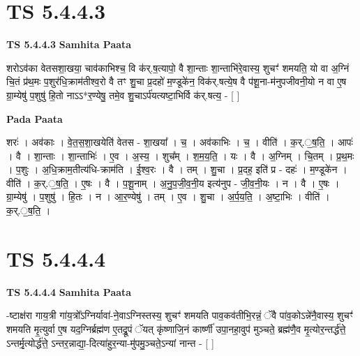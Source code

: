 \documentclass[17pt]{extarticle}
\begin{document}
\section*{ TS 5.4.4.3 }

\textbf{TS 5.4.4.3 } \newline
\textbf{Samhita Paata} \newline

शरोऽव॑का वेतसशा॒खया॒ चाव॑काभिश्च॒ वि क॑र्.ष॒त्यापो॒ वै शा॒न्ताः शा॒न्ताभि॑रे॒वास्य॒ शुचꣳ॑ शमयति॒ यो वा अ॒ग्निं चि॒तं प्र॑थ॒मः प॒शुर॑धि॒क्राम॑तीश्व॒रो वै तꣳ शु॒चा प्र॒दहो॑ म॒ण्डूके॑न॒ विक॑र्.षत्ये॒ष वै प॑शू॒ना-म॑नुपजीवनी॒यो न वा ए॒ष ग्रा॒म्येषु॑ प॒शुषु॑ हि॒तो नाऽऽ*र॒ण्येषु॒ तमे॒व शु॒चाऽर्प॑यत्यष्टा॒भिर्वि क॑र्.षत्य॒ - [  ] \newline

\textbf{Pada Paata} \newline

शरः॑ । अव॑काः । वे॒त॒स॒शा॒खयेति॑ वेतस - शा॒खया᳚ । च॒ । अव॑काभिः । च॒ । वीति॑ । क॒र्.॒ष॒ति॒ । आपः॑ । वै । शा॒न्ताः । शा॒न्ताभिः॑ । ए॒व । अ॒स्य॒ । शुच᳚म् । श॒म॒य॒ति॒ । यः । वै । अ॒ग्निम् । चि॒तम् । प्र॒थ॒मः । प॒शुः । अ॒धि॒क्राम॒तीत्य॑धि-क्राम॑ति । ई॒श्व॒रः । वै । तम् । शु॒चा । प्र॒दह॒ इति॑ प्र - दहः॑ । म॒ण्डूके॑न । वीति॑ । क॒र्.॒ष॒ति॒ । ए॒षः । वै । प॒शू॒नाम् । अ॒नु॒प॒जी॒व॒नी॒य इत्य॑नुप -  जी॒व॒नी॒यः । न । वै । ए॒षः । ग्रा॒म्येषु॑ । प॒शुषु॑ । हि॒तः । न । आ॒र॒ण्येषु॑ । तम् । ए॒व । शु॒चा । अ॒र्प॒य॒ति॒ । अ॒ष्टा॒भिः । वीति॑ । क॒र्.॒ष॒ति॒ ।  \newline




\section*{ TS 5.4.4.4 }

\textbf{TS 5.4.4.4 } \newline
\textbf{Samhita Paata} \newline

-ष्टाक्ष॑रा गाय॒त्री गा॑य॒त्रो᳚ऽग्निर्यावा॑-ने॒वाऽग्निस्तस्य॒ शुचꣳ॑ शमयति पाव॒कव॑तीभि॒रन्नं॒ ॅवै पा॑व॒कोऽन्ने॑नै॒वास्य॒ शुचꣳ॑ शमयति मृ॒त्युर्वा ए॒ष यद॒ग्निर्ब्रह्म॑ण ए॒तद्रू॒पं ॅयत् कृ॑ष्णाजि॒नं कार्ष्णी॑ उपा॒नहा॒वुप॑ मुञ्चते॒ ब्रह्म॑णै॒व मृ॒त्योर॒न्तर्द्ध॑त्ते॒ ऽन्तर्मृ॒त्योर्द्ध॑त्ते॒ ऽन्तर॒न्नाद्या॒-दित्या॑हुर॒न्या-मु॑पमु॒ञ्चते॒ऽन्यां नान्त - [  ] \newline
\end{document}
